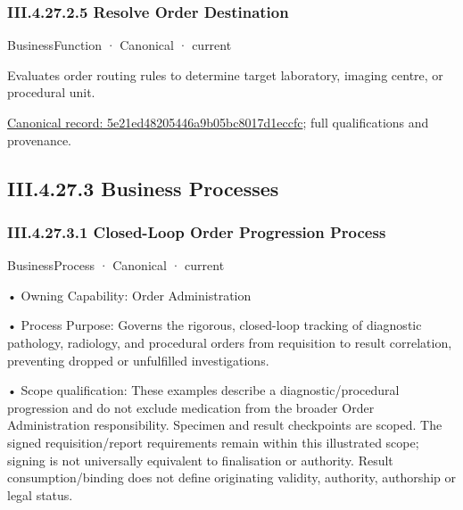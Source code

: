 \subsubsection*{III.4.27.2.5 Resolve Order Destination}
\label{navigation:III.4.27.2.5}

\label{element:5e21ed48205446a9b05bc8017d1eccfc}
{\small BusinessFunction · Canonical · current}\par

Evaluates order routing rules to determine target laboratory, imaging centre, or procedural unit.


{\footnotesize \href{../../../../continuum/business/business-function/5e21ed48205446a9b05bc8017d1eccfc.md}{Canonical record: 5e21ed48205446a9b05bc8017d1eccfc}; full qualifications and provenance.}\par
\subsection*{III.4.27.3 Business Processes}
\label{navigation:III.4.27.3}

\subsubsection*{III.4.27.3.1 Closed-Loop Order Progression Process}
\label{navigation:III.4.27.3.1}

\label{element:e19a7c9594a4401e92450e4c31598982}
{\small BusinessProcess · Canonical · current}\par

•
Owning Capability: Order Administration



•
Process Purpose: Governs the rigorous, closed-loop tracking of diagnostic pathology, radiology, and procedural orders from requisition to result correlation, preventing dropped or unfulfilled investigations.



•
Scope qualification: These examples describe a diagnostic/procedural progression and do not exclude medication from the broader Order Administration responsibility. Specimen and result checkpoints are scoped. The signed requisition/report requirements remain within this illustrated scope; signing is not universally equivalent to finalisation or authority. Result consumption/binding does not define originating validity, authority, authorship or legal status.



